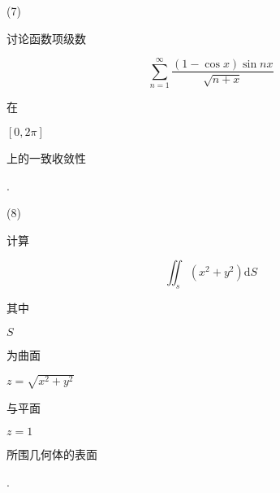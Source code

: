 \documentclass[10pt]{article}
\begin{document}
(7) \begin{CJK}{UTF8}{mj}讨论函数项级数\end{CJK}
$$
\sum_{n=1}^{\infty} \frac{(1-\cos x) \sin n x}{\sqrt{n+x}}
$$
\begin{CJK}{UTF8}{mj}在\end{CJK} $[0,2 \pi]$ \begin{CJK}{UTF8}{mj}上的一致收敛性\end{CJK}.

(8) \begin{CJK}{UTF8}{mj}计算\end{CJK}
$$
\iint_{s}\left(x^{2}+y^{2}\right) \mathrm{d} S
$$
\begin{CJK}{UTF8}{mj}其中\end{CJK} $S$ \begin{CJK}{UTF8}{mj}为曲面\end{CJK} $z=\sqrt{x^{2}+y^{2}}$ \begin{CJK}{UTF8}{mj}与平面\end{CJK} $z=1$ \begin{CJK}{UTF8}{mj}所围几何体的表面\end{CJK}.
\end{document}
